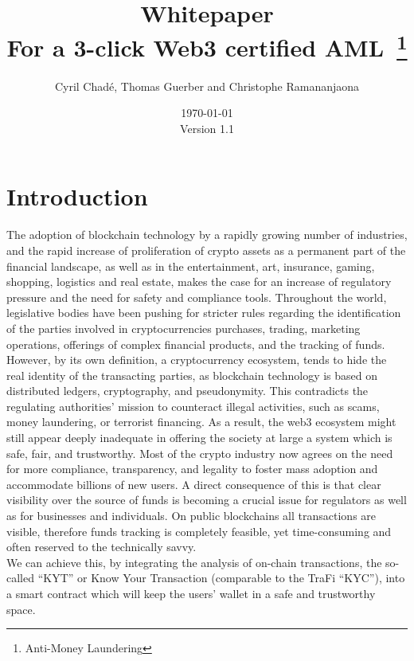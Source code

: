 ﻿\documentclass[a4paper]{article}
\newcommand{\version}{\vspace{10pt}\\ Version 1.1}
\begin{document}
\title{Whitepaper \vspace{10pt} \\
\large For a 3-click Web3 certified AML~\footnote{Anti-Money Laundering}}
\author{Cyril Chad\'e, Thomas Guerber and Christophe Ramananjaona}
\date{\today\version}
\maketitle
\thispagestyle{fancy}
\tableofcontents
\newpage
\section{Introduction}

The adoption of blockchain technology by a rapidly growing number of industries, and the rapid increase of proliferation of crypto assets as a permanent part of the financial landscape, as well as in the entertainment, art, insurance, gaming, shopping, logistics and real estate, makes the case for an increase of regulatory pressure and the need for safety and compliance tools. Throughout the world, legislative bodies have been pushing for stricter rules regarding the identification of the parties involved in cryptocurrencies purchases, trading, marketing operations, offerings of complex financial products, and the tracking of funds.
However, by its own definition, a cryptocurrency ecosystem, tends to hide the real identity of the transacting parties, as blockchain technology is based on distributed ledgers, cryptography, and pseudonymity. This contradicts the regulating authorities’ mission to counteract illegal activities, such as scams, money laundering, or terrorist financing. As a result, the web3 ecosystem might still appear deeply inadequate in offering the society at large a system which is safe, fair, and trustworthy. 
Most of the crypto industry now agrees on the need for more compliance, transparency, and legality to foster mass adoption and accommodate billions of new users. A direct consequence of this is that clear visibility over the source of funds is becoming a crucial issue for regulators as well as for businesses and individuals. On public blockchains all transactions are visible, therefore funds tracking is completely feasible, yet time-consuming and often reserved to the technically savvy. \\

We can achieve this, by integrating the analysis of on-chain transactions, the so-called “KYT” or Know Your Transaction (comparable to the TraFi “KYC”), into a smart contract which will keep the users’ wallet in a safe and trustworthy space. \\
\end{document}
